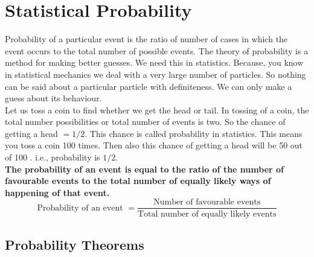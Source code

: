 \section{Statistical Probability}
Probability of a particular event is the ratio of number of cases in which the event occurs to the total number of possible events. The theory of probability is a method for making better guesses. We need this in statistics. Because, you know in statistical mechanics we deal with a very large number of particles. So nothing can be said about a particular particle with definiteness. We can only make a guess about its behaviour.\\
Let us toss a coin to find whether we get the head or tail. In tossing of a coin, the total number possibilities or total number of events is two. So the chance of getting a head $=1 / 2$. This chance is called probability in statistics. This means you toss a coin 100 times. Then also this chance of getting a head will be 50 out of 100 . i.e., probability is $1 / 2$.\\
\textbf{The probability of an event is equal to the ratio of the number of favourable events to the total number of equally likely ways of happening of that event.}\\
$$\text{Probability of an event }=\frac{\text{Number of favourable events}}{\text{Total number of equally likely events}}$$
\subsection{Probability Theorems}


